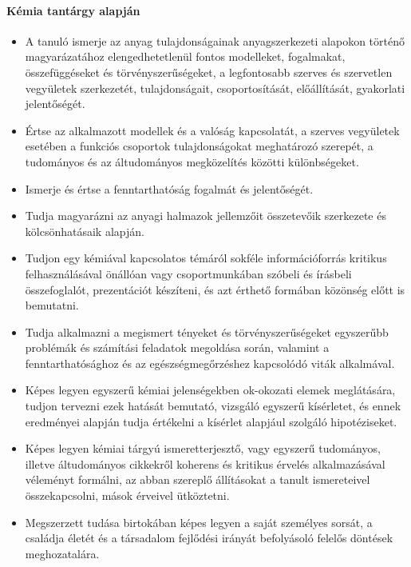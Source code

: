 \paragraph{Kémia tantárgy alapján}
\begin{itemize}
\item A tanuló ismerje az anyag tulajdonságainak anyagszerkezeti alapokon történő magyarázatához elengedhetetlenül fontos modelleket, fogalmakat, összefüggéseket és törvényszerűségeket, a legfontosabb szerves és szervetlen vegyületek szerkezetét, tulajdonságait, csoportosítását, előállítását, gyakorlati jelentőségét.
\item Értse az alkalmazott modellek és a valóság kapcsolatát, a szerves vegyületek esetében a funkciós csoportok tulajdonságokat meghatározó szerepét, a tudományos és az áltudományos megközelítés közötti különbségeket.
\item Ismerje és értse a fenntarthatóság fogalmát és jelentőségét.
\item Tudja magyarázni az anyagi halmazok jellemzőit összetevőik szerkezete és kölcsönhatásaik alapján.
\item Tudjon egy kémiával kapcsolatos témáról sokféle információforrás kritikus felhasználásával önállóan vagy csoportmunkában szóbeli és írásbeli összefoglalót, prezentációt készíteni, és azt érthető formában közönség előtt is bemutatni.
\item Tudja alkalmazni a megismert tényeket és törvényszerűségeket egyszerűbb problémák és számítási feladatok megoldása során, valamint a fenntarthatósághoz és az egészségmegőrzéshez kapcsolódó viták alkalmával.
\item Képes legyen egyszerű kémiai jelenségekben ok-okozati elemek meglátására, tudjon tervezni ezek hatását bemutató, vizsgáló egyszerű kísérletet, és ennek eredményei alapján tudja értékelni a kísérlet alapjául szolgáló hipotéziseket.
\item Képes legyen kémiai tárgyú ismeretterjesztő, vagy egyszerű tudományos, illetve áltudományos cikkekről koherens és kritikus érvelés alkalmazásával véleményt formálni, az abban szereplő állításokat a tanult ismereteivel összekapcsolni, mások érveivel ütköztetni.
\item Megszerzett tudása birtokában képes legyen a saját személyes sorsát, a családja életét és a társadalom fejlődési irányát befolyásoló felelős döntések meghozatalára.
\end{itemize}
